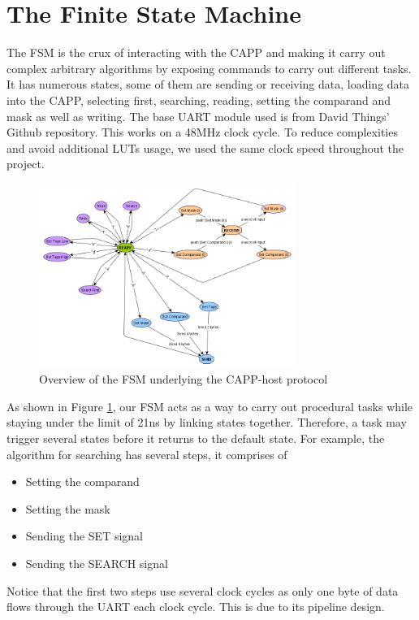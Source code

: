 \section{The Finite State Machine}
The FSM is the crux of interacting with the CAPP and making it carry out complex arbitrary algorithms by exposing commands to carry out different tasks. 
It has numerous states, some of them are sending or receiving data, loading data into the CAPP, selecting first, searching, reading, setting the comparand and mask as well as writing. 
The base UART module used is from David Things' Github repository. \cite{uart} This works on a 48MHz clock cycle.
To reduce complexities and avoid additional LUTs usage, we used the same clock speed throughout the project. 

\begin{figure}
  \includegraphics[height=6cm]{FPGA-CAPP research paper/images/protocol.png}
  \caption{Overview of the FSM underlying the CAPP-host protocol}
  \label{FSM_protocol}
\end{figure}

As shown in Figure \ref{FSM_protocol}, our FSM acts as a way to carry out procedural tasks while staying under the limit of 21ns by linking states together. 
Therefore, a task may trigger several states before it returns to the default state. 
For example, the algorithm for searching has several steps, it comprises of
\begin{itemize}
    \item Setting the comparand 
    \item Setting the mask 
    \item Sending the SET signal
    \item Sending the SEARCH signal 
\end{itemize}

Notice that the first two steps use several clock cycles as only one byte of data flows through the UART each clock cycle. 
This is due to its pipeline design. 

